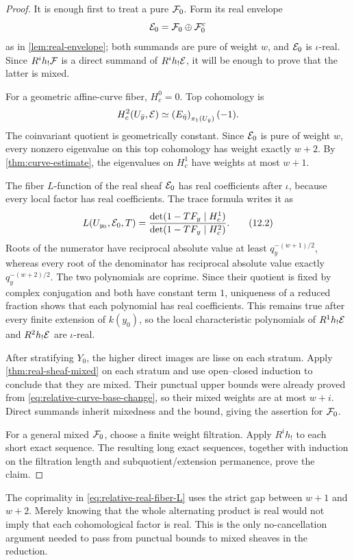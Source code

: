 \begin{proof}
It is enough first to treat a pure \(\mathcal F_0\).  Form its real envelope
\[
  \mathcal E_0=\mathcal F_0\oplus\mathcal F_0^c
\]
as in \cref{lem:real-envelope}; both summands are pure of weight \(w\),
and \(\mathcal E_0\) is \(\iota\)-real.  Since \(R^ih_!\mathcal F\) is a direct
summand of \(R^ih_!\mathcal E\), it will be enough to prove that the latter is
mixed.

For a geometric affine-curve fiber, \(H_c^0=0\).  Top cohomology is
\[
 H_c^2(U_{\bar y},\mathcal E)
 \simeq
 \left(E_{\bar\eta}\right)_{\pi_1(U_{\bar y})}(-1).
\]
The coinvariant quotient is geometrically constant.  Since \(\mathcal E_0\)
is pure of weight \(w\), every nonzero eigenvalue on this top cohomology
has weight exactly \(w+2\).  By
\cref{thm:curve-estimate}, the eigenvalues on \(H_c^1\) have weights at
most \(w+1\).

The fiber \(L\)-function of the real sheaf \(\mathcal E_0\) has real
coefficients after \(\iota\), because every local factor has real
coefficients.  The trace formula writes it as
\[
  L(U_{y_0},\mathcal E_0,T)
  =
  \frac{
    \det(1-TF_y\mid H_c^1)
  }{
    \det(1-TF_y\mid H_c^2)
  }.
\tag{12.2}
\label{eq:relative-real-fiber-L}
\]
Roots of the numerator have reciprocal absolute value at least
\(q_y^{-(w+1)/2}\), whereas every root of the denominator has reciprocal
absolute value exactly \(q_y^{-(w+2)/2}\).  The two polynomials are
coprime.  Since their quotient is fixed by complex conjugation and both
have constant term \(1\), uniqueness of a reduced fraction shows that
each polynomial has real coefficients.  This remains true after every
finite extension of \(k(y_0)\), so the local characteristic polynomials
of \(R^1h_!\mathcal E\) and \(R^2h_!\mathcal E\) are \(\iota\)-real.

After stratifying \(Y_0\), the higher direct images are lisse on each
stratum.  Apply \cref{thm:real-sheaf-mixed} on each stratum and use
open--closed induction to conclude that they are mixed.  Their punctual
upper bounds were already proved from \cref{eq:relative-curve-base-change},
so their mixed weights are at most \(w+i\).  Direct summands inherit
mixedness and the bound, giving the assertion for \(\mathcal F_0\).

For a general mixed \(\mathcal F_0\), choose a finite weight filtration.  Apply
\(R^ih_!\) to each short exact sequence.  The resulting long exact
sequences, together with induction on the filtration length and
subquotient/extension permanence, prove the claim.
\end{proof}

\begin{warning}
The coprimality in \eqref{eq:relative-real-fiber-L} uses the strict gap
between \(w+1\) and \(w+2\).  Merely knowing that the whole alternating
product is real would not imply that each cohomological factor is real.
This is the only no-cancellation argument needed to pass from punctual
bounds to mixed sheaves in the reduction.
\end{warning}

